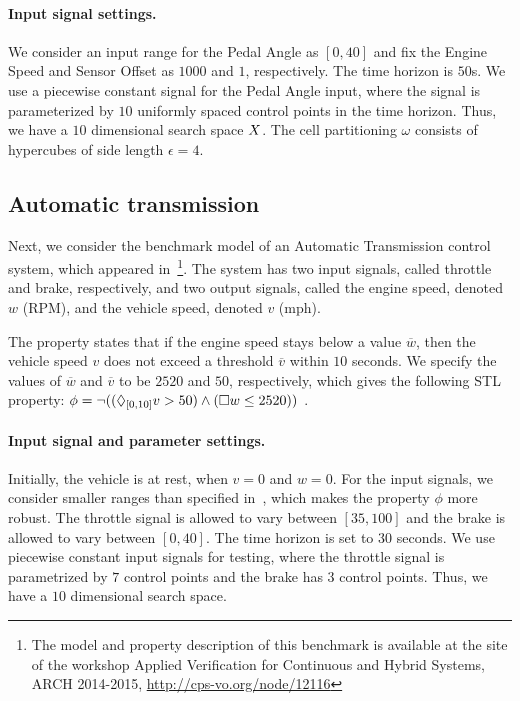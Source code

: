 \paragraph{Input signal settings.}
We consider an input range for
the Pedal Angle as $[0,40]$ and fix the Engine Speed and
Sensor Offset as $1000$ and $1$, respectively. The time horizon is $50$s.  We use  a piecewise constant
signal for the Pedal Angle input, where the signal is parameterized by $10$
uniformly spaced control points in the time horizon.  Thus, we
have a $10$ dimensional search space $X$.%
The cell partitioning $\omega$
consists of hypercubes of side length $\epsilon=4$. 


\subsection{Automatic transmission} \label{sec:autotrans}
Next, we consider the benchmark model of an Automatic Transmission control
system, which appeared in~\cite{DBLP:conf/cpsweek/HoxhaAF14}\footnote{The model
and property description of this benchmark is available at the site of
the workshop Applied Verification for Continuous and Hybrid Systems,
ARCH 2014-2015, \url{http://cps-vo.org/node/12116}}.  The system has
two input signals, called throttle and brake, respectively, and two
output signals, called the engine speed, denoted $w$ (RPM), and the vehicle
speed, denoted $v$ (mph).%

The property states that if the engine speed stays below a value
$\overline{w}$, then the vehicle speed $v$ does not exceed a threshold
$\overline{v}$ within $10$ seconds.  We specify the values of $\overline{w}$ and
$\overline{v}$ to be $2520$ and $50$, respectively, which gives the
following STL property: $\phi=\neg ((\Diamond_{[0,10]}v>50)\wedge(\Box w\leq
2520) )$ \cite{DBLP:conf/cpsweek/HoxhaAF14}.

\paragraph{Input signal and parameter settings.}
Initially, the vehicle is at rest, when $v=0$ and $w=0$.  For the
input signals, we consider smaller ranges than specified
in~\cite{DBLP:conf/cpsweek/HoxhaAF14}, which makes the property $\phi$ more
robust.  The throttle signal is allowed to vary between
$[35,100]$ and the brake is allowed to vary between $[0,40]$.  The
time horizon is set to $30$ seconds.  We use piecewise constant input
signals for testing, where the throttle signal is parametrized by $7$
control points and the brake has $3$ control points. Thus, we have a
$10$ dimensional search space.

